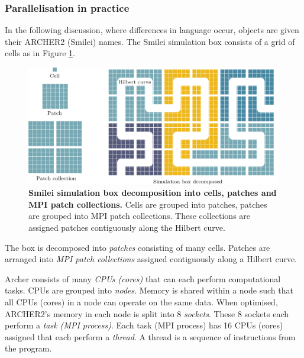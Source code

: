 \subsubsection{Parallelisation in practice}
In the following discussion, where differences in language occur, objects are given their ARCHER2 (Smilei) names. The Smilei simulation box consists of a grid of cells as in Figure \ref{fig:introsmileiparallelisation}.
\begin{figure}
	\centering
	\includegraphics[width=1\linewidth]{figures/intro/intro_smilei_parallelisation}
	\caption[Smilei simulation box decomposition into cells, patches and MPI patch collections.]{\textbf{Smilei simulation box decomposition into cells, patches and MPI patch collections.} Cells are grouped into patches, patches are grouped into MPI patch collections. These collections are assigned patches contiguously along the Hilbert curve.}
	\label{fig:introsmileiparallelisation}
\end{figure}
The box is decomposed into \textit{patches} consisting of many cells. Patches are arranged into \textit{MPI patch collections} assigned contiguously along a Hilbert curve.

Archer consists of many \textit{CPUs (cores)} that can each perform computational tasks. CPUs are grouped into \textit{nodes}. Memory is shared within a node such that all CPUs (cores) in a node can operate on the same data. When optimised, ARCHER2’s memory in each node is split into 8 \textit{sockets}. These 8 sockets each perform a \textit{task (MPI process)}. Each task (MPI process) has 16 CPUs (cores) assigned that each perform a \textit{thread}. A thread is a sequence of instructions from the program.

